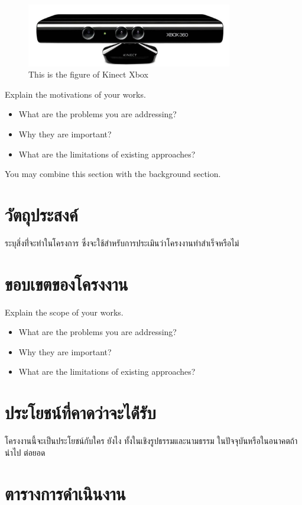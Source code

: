 \documentclass[12pt,oneside,openright,a4paper]{explo-thai-project}
\begin{document}
\cite{bworld}

\begin{figure}[!h]
\centering
\includegraphics[width=90mm]{X11.jpg}
\caption{This is the figure of Kinect Xbox}\label{fig:x1}
\end{figure}

Explain the motivations of your works.  
\begin{itemize}
\item   What are the problems you are addressing? 
\item  Why they are important?
\item  What are the limitations of existing approaches? 
\end{itemize}
You may combine this section with the background section.



\section{วัตถุประสงค์}

ระบุสิ่งท่ี่จะทำในโครงการ ซึ่งจะใช้สำหรับการประเมินว่าโครงงานทำสำเร็จหรือไม่ 

\section{ขอบเขตของโครงงาน}

Explain the scope of your works. 
\begin{itemize}
\item   What are the problems you are addressing? 
\item  Why they are important?
\item  What are the limitations of existing approaches? 
\end{itemize}

\section{ประโยชน์ที่คาดว่าจะได้่รับ}

โครงงานนี้จะเป็นประโยชน์กับใคร ยังไง ทั้งในเชิงรูปธรรมและนามธรรม ในปัจจุบันหรือในอนาคตถ้านำไป
ต่อยอด

\section{ตารางการดำเนินงาน}
\end{document}
